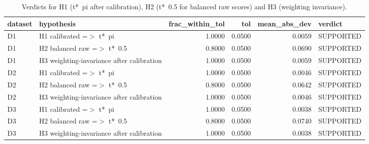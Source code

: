 \begin{table}[t]
\centering
\caption{Verdicts for H1 (t*~pi after calibration), H2 (t*~0.5 for balanced raw scores) and H3 (weighting invariance).}
\label{tab:T4b_h1_h3}
\small
\begin{tabular}{llrrrl}
\toprule
dataset & hypothesis & frac\_within\_tol & tol & mean\_abs\_dev & verdict \\
\midrule
D1 & H1 calibrated =$>$ t*~pi & 1.0000 & 0.0500 & 0.0059 & SUPPORTED \\
D1 & H2 balanced raw =$>$ t*~0.5 & 0.8000 & 0.0500 & 0.0690 & SUPPORTED \\
D1 & H3 weighting-invariance after calibration & 1.0000 & 0.0500 & 0.0059 & SUPPORTED \\
D2 & H1 calibrated =$>$ t*~pi & 1.0000 & 0.0500 & 0.0046 & SUPPORTED \\
D2 & H2 balanced raw =$>$ t*~0.5 & 0.8000 & 0.0500 & 0.0642 & SUPPORTED \\
D2 & H3 weighting-invariance after calibration & 1.0000 & 0.0500 & 0.0046 & SUPPORTED \\
D3 & H1 calibrated =$>$ t*~pi & 1.0000 & 0.0500 & 0.0038 & SUPPORTED \\
D3 & H2 balanced raw =$>$ t*~0.5 & 0.8000 & 0.0500 & 0.0740 & SUPPORTED \\
D3 & H3 weighting-invariance after calibration & 1.0000 & 0.0500 & 0.0038 & SUPPORTED \\
\bottomrule
\end{tabular}
\end{table}
